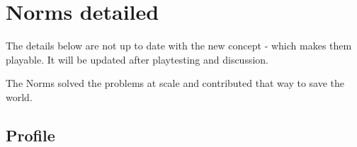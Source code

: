\chapter {Norms detailed}


\begin{warning}
    The details below are not up to date with the new concept - which makes them playable. It will be updated after playtesting and discussion.
\end{warning}

The Norms solved the problems at scale and contributed that way to save the world.

\section{Profile}

